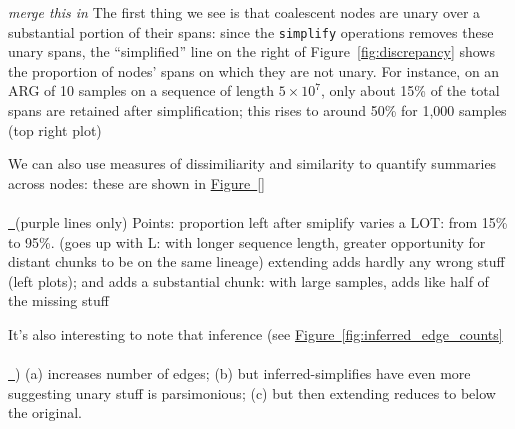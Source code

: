\documentclass[10pt,twoside,lineno]{gsajnl}
\newcommand{\comment}[1]{{\color{violet} \it #1}}
\newcommand*{\figref}[2][]{%
	\hyperref[{#2}]{%
		Figure~\ref*{#2}%
		\ifx\\#1\\%
		\else
		\,#1%
		\fi
	}%
}
\begin{document}
\comment{merge this in}
The first thing we see is that coalescent nodes are unary
over a substantial portion of their spans:
since the \texttt{simplify} operations removes these unary spans,
the ``simplified'' line on the right of Figure~\ref{fig:discrepancy} shows
the proportion of nodes' spans on which they are not unary.
For instance, on an ARG of 10 samples on a sequence of length $5 \times 10^7$,
only about 15\% of the total spans are retained after simplification;
this rises to around 50\% for 1,000 samples (top right plot)

We can also use measures of dissimiliarity and similarity to quantify summaries across nodes:
these are shown in \figref{} (purple lines only)
Points:
proportion left after smiplify varies a LOT: from 15\% to 95\%.
    (goes up with L: with longer sequence length, greater opportunity for distant chunks to be on the same lineage)
extending adds hardly any wrong stuff (left plots); and adds a substantial chunk: with large samples, adds like half of the missing stuff

It's also interesting to  note that inference
(see \figref{fig:inferred_edge_counts})
(a) increases number of edges;
(b) but inferred-simplifies have even more suggesting unary stuff is parsimonious;
(c) but then extending reduces to below the original.
\end{document}
